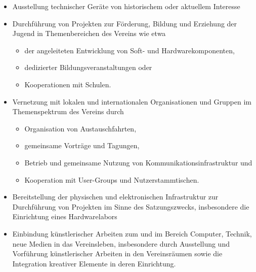 \documentclass[fontsize=12pt,paper=a4,pagesize,headings=small]{scrartcl}
\begin{document}
\begin{enumerate}
\begin{itemize}
		\item Ausstellung technischer Geräte von historischem oder aktuellem
			Interesse

		\item Durchführung von Projekten zur Förderung, Bildung und Erziehung
			der Jugend in Themenbereichen des Vereins wie etwa
			\begin{itemize}
				\item der angeleiteten Entwicklung von Soft- und Hardwarekomponenten,
				\item dedizierter Bildungsveranstaltungen oder
				\item Kooperationen mit Schulen.
		\end{itemize}

		\item Vernetzung mit lokalen und internationalen Organisationen und
			Gruppen im Themenspektrum des Vereins durch
			\begin{itemize}
				\item Organisation von Austauschfahrten,
				\item gemeinsame Vorträge und Tagungen,
				\item Betrieb und gemeinsame Nutzung von
					Kommunikationsinfrastruktur und
				\item Kooperation mit User-Groups und Nutzerstammtischen.
			\end{itemize}

		\item Bereitstellung der physischen und elektronischen Infrastruktur zur
			Durchführung von Projekten im Sinne des Satzungszwecks,
			insbesondere die Einrichtung eines Hardwarelabors

		\item Einbindung künstlerischer Arbeiten zum und im Bereich Computer,
			Technik, neue Medien in das Vereinsleben, insbesondere durch
			Ausstellung und Vorführung künstlerischer Arbeiten in den
			Vereinsräumen sowie die Integration kreativer Elemente in
			deren Einrichtung.
	\end{itemize}
\end{enumerate}
\end{document}
